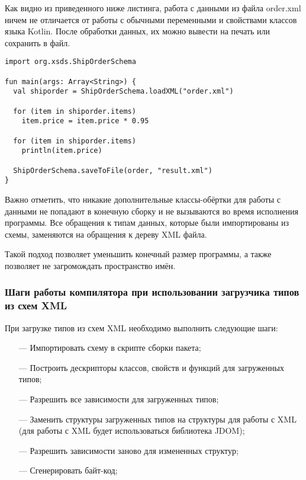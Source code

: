 \documentclass{article}
\begin{document}
Как видно из приведенного ниже листинга, работа с данными из файла order.xml ничем не отличается от работы с обычными переменными и свойствами классов языка Kotlin. После обработки данных, их можно вывести на печать или сохранить в файл.

\begin{lstlisting}
import org.xsds.ShipOrderSchema

fun main(args: Array<String>) {
  val shiporder = ShipOrderSchema.loadXML("order.xml")

  for (item in shiporder.items)
    item.price = item.price * 0.95

  for (item in shiporder.items)
    println(item.price)

  ShipOrderSchema.saveToFile(order, "result.xml")
}
\end{lstlisting}

Важно отметить, что никакие дополнительные классы-обёртки для работы с данными не попадают в конечную сборку и не вызываются во время исполнения программы.
Все обращения к типам данных, которые были импортированы из схемы, заменяются на обращения к дереву XML файла.

Такой подход позволяет уменьшить конечный размер программы, а также позволяет не загромождать пространство имён.

\subsubsection{Шаги работы компилятора при использовании загрузчика типов из схем XML}
При загрузке типов из схем XML необходимо выполнить следующие шаги:
\begin{itemize}
\item[---] Импортировать схему в скрипте сборки пакета;
\item[---] Построить дескрипторы классов, свойств и функций для загруженных типов;
\item[---] Разрешить все зависимости для загруженных типов;
\item[---] Заменить структуры загруженных типов на структуры для работы с XML (для работы с XML будет использоваться библиотека JDOM);
\item[---] Разрешить зависимости заново для измененных структур;
\item[---] Сгенерировать байт-код;
\end{itemize}
\end{document}
